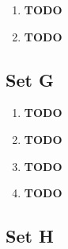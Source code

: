 \documentclass{article}
\begin{document}
\begin{enumerate}
    \item \textbf{TODO}
    
    \item \textbf{TODO}
\end{enumerate}

\subsection{Set G}
\begin{enumerate}
    \item \textbf{TODO}
    \item \textbf{TODO}
    \item \textbf{TODO}
    \item \textbf{TODO}
\end{enumerate}

\subsection{Set H}
\end{document}
